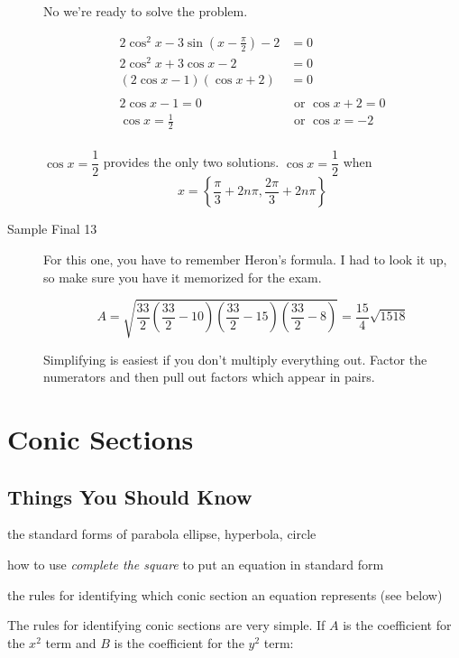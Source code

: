 \documentclass[fleqn,addpoints]{exam}
\begin{document}
\begin{description}
No we're ready to solve the problem.

\begin{align*}
  2 \cos^2 x - 3 \sin \left(x - \frac{\pi}{2} \right) - 2 &= 0 \\
  2 \cos^2 x + 3 \cos x - 2 &= 0 \\
  (2\cos x - 1)(\cos x + 2) &= 0 \\
  \\
  2 \cos x - 1 = 0     & \text{ or } \cos x + 2 = 0 \\
  \cos x = \frac{1}{2} & \text{ or } \cos x = -2 \\
\end{align*}

$\cos x = \dfrac{1}{2}$ provides the only two solutions.  $\cos x = \dfrac{1}{2}$ when 
\[
  x = \left\{ \frac{\pi}{3} + 2 n \pi, \frac{2 \pi}{3} + 2 n \pi \right\}
\]

\item[Sample Final 13]
For this one, you have to remember Heron's formula.  I had to look it up, so make sure you have it memorized for the
exam.

\[
  A = \sqrt{ \frac{33}{2} \left(\frac{33}{2} - 10 \right) \left(\frac{33}{2} - 15 \right) \left(\frac{33}{2} - 8 \right)}
  = \frac{15}{4}\sqrt{1518}
\]

Simplifying is easiest if you don't multiply everything out.  Factor the numerators and then pull out factors which
appear in pairs.

\end{description}
\section{Conic Sections}

\subsection{Things You Should Know}
\begin{itemize*}
  \item the standard forms of parabola ellipse, hyperbola, circle
  \item how to use {\em complete the square} to put an equation in standard form
  \item the rules for identifying which conic section an equation represents (see below)
\end{itemize*}

The rules for identifying conic sections are very simple.  If $A$ is the coefficient for the $x^2$ term and $B$ is the
coefficient for the $y^2$ term:
\end{document}
